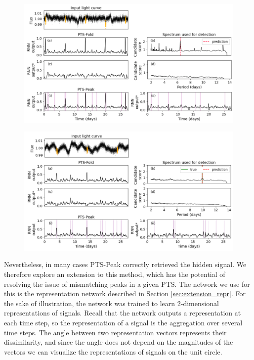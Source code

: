 \begin{figure}
    \centering
    \includegraphics[width=0.9\linewidth]{Experiments/Figures/Algorithm/both_correct.png}
    \caption{}
    \label{fig:algorithm-both_correct}
\end{figure}

\begin{figure}
    \centering
    \includegraphics[width=0.9\linewidth]{Experiments/Figures/Algorithm/peak_fail.png}
    \caption{}
    \label{fig:algorithm-peak_fail}
\end{figure}

Nevertheless, in many cases PTS-Peak correctly retrieved the hidden signal. We therefore explore an extension to this method, which has the potential of resolving the issue of mismatching peaks in a given PTS. The network we use for this is the representation network described in Section \ref{sec:extension_repr}. For the sake of illustration, the network was trained to learn 2-dimensional representations of signals. Recall that the network outputs a representation at each time step, so the representation of a signal is the aggregation over several time steps. The angle between two representation vectors represents their dissimilarity, and since the angle does not depend on the magnitudes of the vectors we can visualize the representations of signals on the unit circle.


